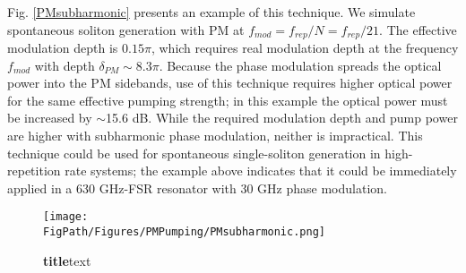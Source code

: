 Fig. \ref{PMsubharmonic} presents an example of this technique. We simulate spontaneous soliton generation with PM at $f_{mod}=f_{rep}/N=f_{rep}/21$. The effective modulation depth is $0.15\pi$, which requires real modulation depth at the frequency $f_{mod}$ with depth $\delta_{PM}\sim8.3\pi$.  Because the phase modulation spreads the optical power into the PM sidebands, use of this technique requires higher optical power for the same effective pumping strength; in this example the optical power must be increased by $\sim$15.6 dB. While the required modulation depth and pump power are higher with subharmonic phase modulation, neither is impractical. This technique could be used for spontaneous single-soliton generation in high-repetition rate systems; the example above indicates that it could be immediately applied in a 630 GHz-FSR resonator with 30 GHz phase modulation. 

\begin{figure}[htpb]
	\begin{center}
		\texttt{[image: \\FigPath/Figures/PMPumping/PMsubharmonic.png]}
	\end{center}
	\caption[Figure Title]{\textbf{title}text}
	\label{fig:PMsubharmonic}
\end{figure} 

